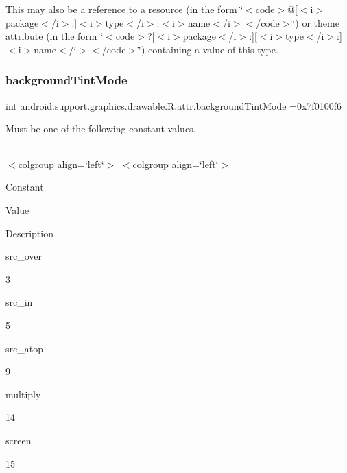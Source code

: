 This may also be a reference to a resource (in the form \char`\"{}$<$code$>$@\mbox{[}$<$i$>$package$<$/i$>$\+:\mbox{]}$<$i$>$type$<$/i$>$\+:$<$i$>$name$<$/i$>$$<$/code$>$\char`\"{}) or theme attribute (in the form \char`\"{}$<$code$>$?\mbox{[}$<$i$>$package$<$/i$>$\+:\mbox{]}\mbox{[}$<$i$>$type$<$/i$>$\+:\mbox{]}$<$i$>$name$<$/i$>$$<$/code$>$\char`\"{}) containing a value of this type. \mbox{\label{classandroid_1_1support_1_1graphics_1_1drawable_1_1R_1_1attr_a4d30313d6e376e0f25874611b925da63}} 
\subsubsection{\texorpdfstring{background\+Tint\+Mode}{backgroundTintMode}}
{\footnotesize\ttfamily int android.\+support.\+graphics.\+drawable.\+R.\+attr.\+background\+Tint\+Mode =0x7f0100f6\hspace{0.3cm}{\ttfamily [static]}}

Must be one of the following constant values.

\tabulinesep=1mm
\begin{longtabu} spread 0pt [c]{*{0}{|X[-1]}|}
\hline
\end{longtabu}
$<$colgroup align=\char`\"{}left\char`\"{}$>$ $<$colgroup align=\char`\"{}left\char`\"{}$>$ 

Constant

Value

Description 

{\ttfamily src\+\_\+over}

3

{\ttfamily src\+\_\+in}

5

{\ttfamily src\+\_\+atop}

9

{\ttfamily multiply}

14

{\ttfamily screen}

15\mbox{\label{classandroid_1_1support_1_1graphics_1_1drawable_1_1R_1_1attr_aca71da10914622be3e4c40bbe8050f20}} 
